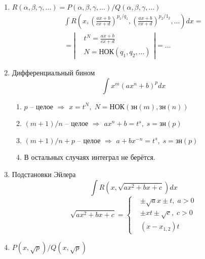 \documentclass{article}
\newcommand{\x}{\text}
\begin{document}
\begin{itemize}
          \begin{enumerate}
              \item $R(\alpha,\beta, \gamma,\ldots) = {P(\alpha, \beta, \gamma, \ldots)}/{Q(\alpha, \beta, \gamma, \ldots)} $
                    \begin{multline*}
                        \int R\left(x, \left(\frac{ax + b}{cx+d}\right)^{p_1/q_1}, \left(\frac{ax + b}{cx+ d}\right)^{p_2/1_2}, \ldots \right)dx = \\ = \left|
                        \begin{aligned}
                             & t^N = \frac{ax+b}{cx+d}       \\
                             & N = \x{НОК}(q_1, q_2, \ldots)
                        \end{aligned} \right| = \ldots
                    \end{multline*}
              \item Дифференциальный бином
                    $$ \int x^m (ax^n+b)^pdx $$
                    \begin{enumerate}
                        \item $p$ -- целое $\Rightarrow$ $x = t^N, \; N = \x{НОК}(\x{зн}(m), \x{зн}(n))$
                        \item $(m+1)/{n}$ -- целое $\Rightarrow$ $ax^n+b = t^s, \; s=\x{зн}(p)$
                        \item ${(m+1)}/{n}+p$ -- целое $\Rightarrow$ $a + b x^{-n} = t^s, \; s=\x{зн}(p)$
                        \item В остальных случаях интеграл не берётся.
                    \end{enumerate}
              \item Подстановки Эйлера
                    $$ \int R\left(x, \sqrt{ax^2+bx+c}\right)dx $$
                    \begin{equation*}
                        \sqrt{ax^2+bx+c} = \left\{
                        \begin{aligned}
                             & \pm \sqrt{a}x \pm t, \; a > 0 \\
                             & \pm xt \pm \sqrt{c}, \; c > 0 \\
                             & (x-x_{1,2})t
                        \end{aligned}
                        \right.
                    \end{equation*}
              \item $P(x, \sqrt{p})/Q(x, \sqrt{p})$

\end{enumerate}
\end{itemize}
\end{document}

